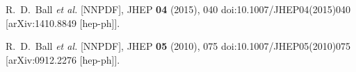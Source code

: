 \documentclass[10pt,a4paper]{article}
\begin{document}
\begin{thebibliography}{alp}
R.~D.~Ball \textit{et al.} [NNPDF],
JHEP \textbf{04} (2015), 040
doi:10.1007/JHEP04(2015)040
[arXiv:1410.8849 [hep-ph]].

R.~D.~Ball \textit{et al.} [NNPDF],
JHEP \textbf{05} (2010), 075
doi:10.1007/JHEP05(2010)075
[arXiv:0912.2276 [hep-ph]].

\end{thebibliography}
\end{document}
